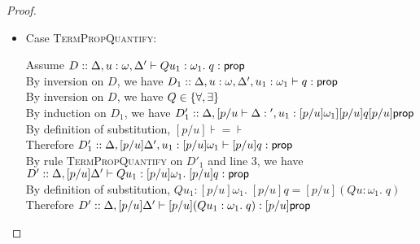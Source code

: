 \begin{proof}
\begin{enumerate}
\begin{itemize}
    \item Case \textsc{TermPropQuantify}: 
      \begin{tabbedproof}
        \oo Assume $D :: \judgeA[\Delta, u:\omega, \Delta']{Q u_1:\omega_1.\; q}{\assert}$ \\
        \ooo By inversion on $D$, we have 
             $D_1 :: \judgeA[\Delta, u:\omega, \Delta', u_1:\omega_1]{q}{\assert}$ \\
        \ooo By inversion on $D$, we have $Q \in \setof{\forall, \exists}$ \\
        \ooo By induction on $D_1$, we have 
             $D'_1 :: \judgeA[\Delta, [p/u]\Delta', u_1:[p/u]\omega_1]{[p/u]q}{[p/u]\assert}$ \\
        \ooo By definition of substitution, $[p/u]\assert = \assert$ \\
        \ooo Therefore $D'_1 :: \judgeA[{\Delta, [p/u]\Delta', u_1:[p/u]\omega_1}]{[p/u]q}{\assert}$ \\
        \ooo By rule \textsc{TermPropQuantify} on $D'_1$ and line 3, we have \\
        \oox $D' :: \judgeA[{\Delta, [p/u]\Delta'}]{Q u_1:[p/u]\omega_1.\;[p/u]q}{\assert}$ \\
        \ooo By definition of substitution, $Q u_1:[p/u]\omega_1.\;[p/u]q = [p/u](Q u:\omega_1.\; q)$ \\
        \ooo Therefore $D' :: \judgeA[{\Delta, [p/u]\Delta'}]{[p/u](Q u_1:\omega_1.\;q)}{[p/u]\assert}$ \\
      \end{tabbedproof}


\end{itemize}
\end{enumerate}
\end{proof}

